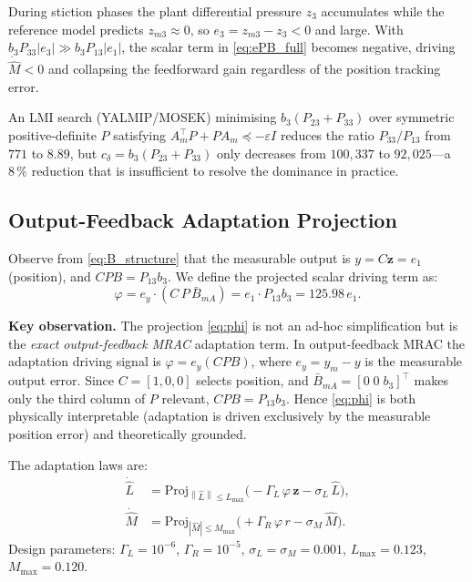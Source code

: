 \documentclass[12pt,a4paper]{article}
\theoremstyle{plain}
\theoremstyle{definition}
\theoremstyle{remark}
\newcommand{\norm}[1]{\left\|#1\right\|}
\newcommand{\abs}[1]{\left|#1\right|}
\newcommand{\bB}{\bar{B}}       %
\newcommand{\Am}{A_m}           %
\newcommand{\Lh}{\hat{L}}       %
\newcommand{\Mh}{\hat{M}}       %
\newcommand{\eph}{\varphi}      %
\newcommand{\sL}{\sigma_L}
\newcommand{\sM}{\sigma_M}
\newcommand{\GL}{\Gamma_L}
\newcommand{\GR}{\Gamma_R}
\newcommand{\Proj}{\mathrm{Proj}}
\newcommand{\ze}{\mathbf{z}}    %
\begin{document}
During stiction phases the plant differential pressure $z_3$
accumulates while the reference model predicts $z_{m3}\approx0$,
so $e_3=z_{m3}-z_3<0$ and large.  With $b_3 P_{33}\abs{e_3}\gg
b_3 P_{13}\abs{e_1}$, the scalar term in \eqref{eq:ePB_full} becomes
negative, driving $\dot{\Mh}<0$ and collapsing the feedforward gain
regardless of the position tracking error.

An LMI search (YALMIP/MOSEK) minimising
$b_3(P_{23}+P_{33})$ over symmetric positive-definite $P$ satisfying
$\Am^\top P+P\Am\preceq -\varepsilon I$ reduces the ratio
$P_{33}/P_{13}$ from $771$ to $8.89$, but $c_\delta=b_3(P_{23}+P_{33})$
only decreases from $100{,}337$ to $92{,}025$---a $8\,\%$ reduction
that is insufficient to resolve the dominance in practice.

\subsection{Output-Feedback Adaptation Projection}
\label{sec:projection}

Observe from \eqref{eq:B_structure} that the measurable output is
$y = C\ze = e_1$ (position), and $CPB = P_{13}b_3$.  We define the
projected scalar driving term as:
\begin{equation}
\boxed{\eph = e_y\cdot(C\,P\,\bB_{mA}) = e_1\cdot P_{13}b_3 = 125.98\,e_1.}
\label{eq:phi}
\end{equation}

\textbf{Key observation.} The projection \eqref{eq:phi} is not an
ad-hoc simplification but is the \emph{exact output-feedback MRAC}
adaptation term.  In output-feedback MRAC the adaptation driving
signal is $\eph = e_y(CPB)$, where $e_y = y_m - y$ is the measurable
output error.  Since $C=[1,0,0]$ selects position, and
$\bB_{mA}=[0\;0\;b_3]^\top$ makes only the third column of $P$
relevant, $CPB = P_{13}b_3$.  Hence \eqref{eq:phi} is both
physically interpretable (adaptation is driven exclusively by the
measurable position error) and theoretically grounded.

The adaptation laws are:
\begin{align}
\dot{\Lh} &= \Proj_{\norm{\Lh}\le L_{\max}}\!\bigl(-\GL\,\eph\,\ze
             - \sL\,\Lh\bigr), \label{eq:Lhat_dot}\\
\dot{\Mh} &= \Proj_{\abs{\Mh}\le M_{\max}}\!\bigl(+\GR\,\eph\,r
             - \sM\,\Mh\bigr). \label{eq:Mhat_dot}
\end{align}
Design parameters: $\GL=10^{-6}$, $\GR=10^{-5}$,
$\sL=\sM=0.001$, $L_{\max}=0.123$, $M_{\max}=0.120$.
\end{document}
